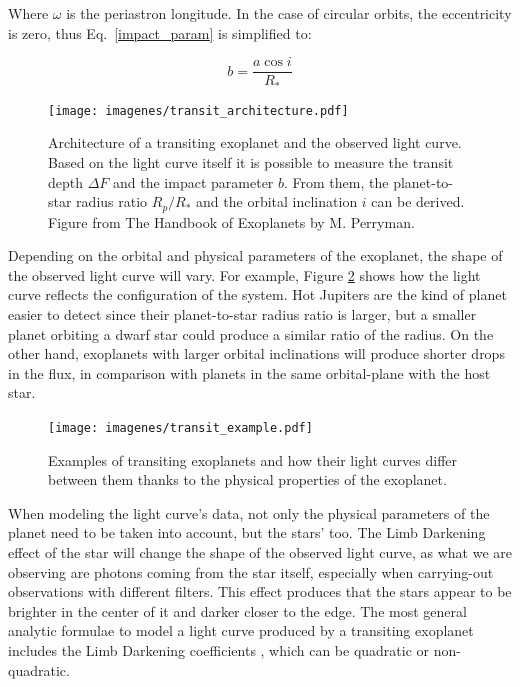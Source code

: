 Where $\omega$ is the periastron longitude. In the case of circular orbits, the eccentricity is zero, thus Eq.~\ref{impact_param} is simplified to:

\begin{equation}
    b = \frac{a\cos{i}}{R_{*}}
\label{impact_param_simple}
\end{equation}

\begin{figure}[ht]
\centering
\texttt{[image: imagenes/transit\_architecture.pdf]}
\caption{Architecture of a transiting exoplanet and the observed light curve. Based on the light curve itself it is possible to measure the transit depth $\Delta F$ and the impact parameter $b$. From them, the planet-to-star radius ratio $R_{p}/R_{*}$ and the orbital inclination $i$ can be derived. Figure from The Handbook of Exoplanets by M. Perryman.}
\label{transit}
\end{figure}

Depending on the orbital and physical parameters of the exoplanet, the shape of the observed light curve will vary. For example, Figure \ref{transit_examples} shows how the light curve reflects the configuration of the system. Hot Jupiters are the kind of planet easier to detect since their planet-to-star radius ratio is larger, but a smaller planet orbiting a dwarf star could produce a similar ratio of the radius. On the other hand, exoplanets with larger orbital inclinations will produce shorter drops in the flux, in comparison with planets in the same orbital-plane with the host star.     

\begin{figure}[h]
\centering
\texttt{[image: imagenes/transit\_example.pdf]}
\caption{Examples of transiting exoplanets and how their light curves differ between them thanks to the physical properties of the exoplanet.}
\label{transit_examples}
\end{figure}

When modeling the light curve's data, not only the physical parameters of the planet need to be taken into account, but the stars' too. The Limb Darkening effect of the star will change the shape of the observed light curve, as what we are observing are photons coming from the star itself, especially when carrying-out observations with different filters. This effect produces that the stars appear to be brighter in the center of it and darker closer to the edge. The most general analytic formulae to model a light curve produced by a transiting exoplanet includes the Limb Darkening coefficients \citep{Mandel2002}, which can be quadratic or non-quadratic.

